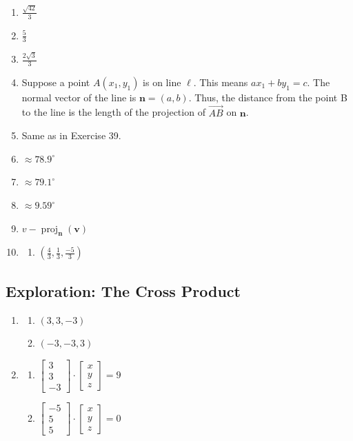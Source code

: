 \documentclass{article}
\newcommand{\vv}{\mathbf{v}}
\newcommand{\vn}{\mathbf{n}}
\newcommand{\colvecThree}[3]{
  \begin{bmatrix}
    #1 \\
    #2 \\
    #3
  \end{bmatrix}
}
\begin{document}
\begin{enumerate}
  \item $\frac{\sqrt{42}}{3}$
  \item $\frac{5}{3}$
  \item $\frac{2\sqrt{3}}{3}$
  \item Suppose a point $A(x_1, y_1)$ is on line $\ell$. This means $ax_1+by_1=c$. The normal vector
    of the line is $\vn=(a, b)$. Thus, the distance from the point B to the line is the length of the
    projection of $\overrightarrow{AB}$ on $\vn$.
  \item Same as in Exercise 39.
    \setcounter{enumi}{42}
  \item $\approx78.9^\circ$
  \item $\approx79.1^\circ$
  \item $\approx9.59^\circ$
    \setcounter{enumi}{46}
  \item $v-\operatorname{proj}_{\vn}(\vv)$
  \item
    \begin{enumerate}
      \item $\left(\frac{4}{3}, \frac{1}{3}, \frac{-5}{3}\right)$
    \end{enumerate}
\end{enumerate}

\subsection*{Exploration: The Cross Product}
\begin{enumerate}
  \item
    \begin{enumerate}
      \item $(3, 3, -3)$
      \item $(-3, -3, 3)$
    \end{enumerate}
    \setcounter{enumi}{3}
  \item
    \begin{enumerate}
      \item $\colvecThree{3}{3}{-3}\cdot\colvecThree{x}{y}{z}=9$
      \item $\colvecThree{-5}{5}{5}\cdot\colvecThree{x}{y}{z}=0$
    \end{enumerate}
\end{enumerate}
\end{document}
